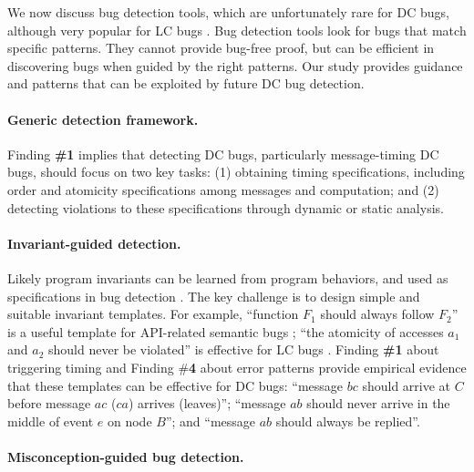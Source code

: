 We now discuss bug detection tools, which are
unfortunately rare for DC bugs, although very popular for
LC bugs
%
\cite{pacer,
  flanagan09fasttrack, 
  satish.pldi14, 
  avio.asplos06, 
  madanpldi07,
  savage97eraser}.
%
Bug detection tools look for bugs that match specific patterns.  They
cannot provide bug-free proof, but can be efficient in discovering
bugs when guided by the right patterns.
Our study provides guidance and patterns that can be exploited by
future DC bug detection.

\paragraph{Generic detection framework.}

Finding {\bf \#1} implies that
detecting DC bugs, particularly message-timing DC bugs, should focus
on two key tasks: (1) obtaining timing specifications, including order
and atomicity specifications among messages and computation; and (2)
detecting violations to these specifications through dynamic or static
analysis.

\paragraph{Invariant-guided detection.}

Likely program invariants can be learned from program
behaviors, and used as specifications in bug detection
\cite{engler01bugs, daikon00, avio.asplos06}.
The key challenge is to design
simple and suitable 
invariant templates.  For example, ``function $F_1$ should
always follow $F_2$'' is a useful template for API-related semantic
bugs \cite{engler01bugs};
``the atomicity of accesses $a_1$ and $a_2$ should never be violated''
is effective for LC bugs \cite{avio.asplos06}.
%
%
Finding {\bf \#1} about triggering timing and Finding
\#{\bf 4} about error patterns provide empirical evidence that these
templates can be effective for DC bugs: ``message $bc$ should
arrive at $C$ before message $ac$ ($ca$) arrives (leaves)''; 
``message $ab$
should never arrive in the middle of event $e$ on node $B$''; and
``message $ab$ should always be replied''.

\paragraph{Misconception-guided bug detection.}

